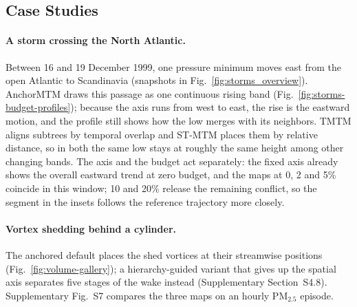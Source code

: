 \subsection{Case Studies}\label{sec:case-studies}
\paragraph{A storm crossing the North Atlantic.} Between 16 and 19 December 1999, one pressure minimum moves east from the open Atlantic to Scandinavia (snapshots in Fig.~\ref{fig:storms_overview}). AnchorMTM draws this passage as one continuous rising band (Fig.~\ref{fig:storms-budget-profiles}); because the axis runs from west to east, the rise is the eastward motion, and the profile still shows how the low merges with its neighbors. TMTM aligns subtrees by temporal overlap and ST-MTM places them by relative distance, so in both the same low stays at roughly the same height among other changing bands. The axis and the budget act separately: the fixed axis already shows the overall eastward trend at zero budget, and the maps at 0, 2 and 5\% coincide in this window; 10 and 20\% release the remaining conflict, so the segment in the insets follows the reference trajectory more closely.

\paragraph{Vortex shedding behind a cylinder.} The anchored default places the shed vortices at their streamwise positions (Fig.~\ref{fig:volume-gallery}); a hierarchy-guided variant that gives up the spatial axis separates five stages of the wake instead (Supplementary Section~S4.8). Supplementary Fig.~S7 compares the three maps on an hourly PM$_{2.5}$ episode.

